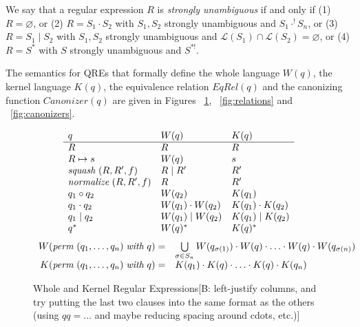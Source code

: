 \documentclass{svproc}
\newcommand{\FINISH}[3]{\ifdraft\textcolor{#1}{[#2: #3]}\fi}
\newcommand{\bcp}[1]{\FINISH{dkred}{B}{#1}}
\newcommand{\squash}[3]{\ensuremath{\mathit{squash} \; (#1, #2, #3)}}
\newcommand{\perm}[2]{\ensuremath{\mathit{perm}\; (#1)\; \mathit{with}\; #2}}
\newcommand{\normalize}[3]{\ensuremath{\mathit{normalize} \; (#1, #2, #3)}}
\newcommand{\sep}{\ensuremath{\; | \;}}
\newcommand{\canonizer}{\ensuremath{\mathit{Canonizer}}}
\begin{document}
We say that a regular expression $R$ is \textit{strongly unambiguous} if and
only if (1) $R = \varnothing$, or (2) $R = S_1 \cdot S_2$ with $S_1, S_2$
strongly unambiguous and $S_1 \cdot^! S_n$, or (3) $R = S_1 \sep S_2$ with
$S_1, S_2$ strongly unambiguous and $\mathcal{L}(S_1) \cap \mathcal{L}(S_2) =
\varnothing$, or (4) $R = S^*$ with $S$ strongly unambiguous and $S^{*!}$.

The semantics for QREs that formally define the whole language $W(q)$, the
kernel language $K(q)$, the equivalence relation $EqRel(q)$ and the
canonizing function $\canonizer(q)$ are given in Figures ~\ref{fig:wk},
~\ref{fig:relations} and ~\ref{fig:canonizers}.
\begin{figure}[t]
  \centering
  \[
    \begin{array}{l@{\quad}l@{\quad}l}
   
      q & W(q) & K(q) \\ \hline
      R & R & R \\
      R \mapsto s & W(q) & s \\
      \squash{R}{R'}{f} & R \sep R' & R' \\
      \normalize{R}{R'}{f} & R & R' \\
      q_1 \circ  q_2 & W(q_2) & K(q_1) \\
      q_1 \cdot q_2 & W(q_1) \cdot W(q_2) & K(q_1) \cdot K(q_2) \\
      q_1 \sep q_2 & W(q_1) \sep W(q_2) & K(q_1) \sep K(q_2) \\
      q^* & W(q)^* & K(q)^* \\
    \end{array}
  \]
\[
\begin{array}{r@{\quad}l}
W( \perm{q_1, \ldots, q_n}{q} ) = &
\bigcup \limits_{\sigma \in S_n} W(q_{\sigma(1)}) \cdot W(q) \cdot \ldots \cdot
W(q) \cdot W(q_{\sigma(n)})
\\
K( \perm{q_1, \ldots, q_n}{q} ) = &
 K(q_1) \cdot K(q) \cdot \ldots \cdot K(q) \cdot K(q_n) 
\end{array}
\]
  \caption{Whole and Kernel Regular Expressions\bcp{left-justify columns,
      and try putting the last two clauses into the same format as the
      others (using $\mathit{qq} = ...$ and maybe reducing spacing around
      cdots, etc.)}}
  \label{fig:wk}
\end{figure}
\end{document}
